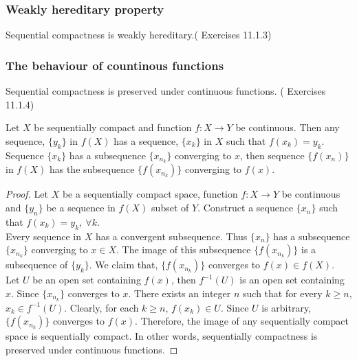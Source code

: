 \subsubsection{Weakly hereditary property}
\begin{theorem}
	Sequential compactness is weakly hereditary.(\cite{joshi} Exercises 11.1.3)
\end{theorem}

\subsubsection{The behaviour of countinous functions}
\begin{theorem}
	Sequential compactness is preserved under continuous functions. (\cite{joshi} Exercises 11.1.4)
\end{theorem}
\begin{synopsis}
	Let $X$ be sequentially compact and function $f : X \to Y$ be continuous. Then any sequence, $\{y_k\}$ in $f(X)$ has a sequence, $\{x_k\}$ in $X$ such that $f(x_k) = y_k$. Sequence $\{x_k\}$ has a subsequence $\{x_{n_k}\}$ converging to $x$, then sequence $\{ f(x_n)\}$ in $f(X)$ has the subsequence $\{f(x_{n_k})\}$ converging to $f(x)$.
\end{synopsis}
\begin{proof}
	Let $X$ be a sequentially compact space, function $f: X \to Y$ be continuous and $\{y_n\}$ be a sequence in $f(X)$ subset of $Y$. Construct a sequence $\{x_n\}$ such that $f(x_k) = y_k,\ \forall k$.\\

	Every sequence in $X$ has a convergent subsequence. Thus $\{x_n\}$ has a subsequence $\{x_{n_k}\}$ converging to $x \in X$. The image of this subsequence $\{f(x_{n_k})\}$ is a subsequence of $\{y_k\}$. We claim that, $\{f(x_{n_k})\}$ converges to $f(x) \in f(X)$.\\

	Let $U$ be an open set containing $f(x)$, then $f^{-1}(U)$ is an open set containing $x$. Since $\{x_{n_k}\}$ converges to $x$. There exists an integer $n$ such that for every $k \ge n$, $x_k \in f^{-1}(U)$. Clearly, for each $k \ge n$, $f(x_k) \in U$. Since $U$ is arbitrary, $\{ f(x_{n_k})\}$ converges to $f(x)$. Therefore, the image of any sequentially compact space is sequentially compact. In other words, sequentially compactness is preserved under continuous functions.
\end{proof}

